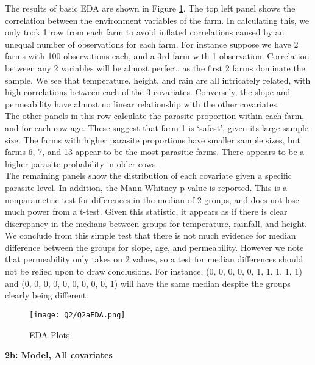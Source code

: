 \documentclass[11pt]{article}
\begin{document}
The results of basic EDA are shown in Figure \ref{Fig::2aEDA}. The top left panel shows the correlation between the environment variables of the farm. In calculating this, we only took 1 row from each farm to avoid inflated correlations caused by an unequal number of observations for each farm. For instance suppose we have 2 farms with 100 observations each, and a 3rd farm with 1 observation. Correlation between any 2 variables will be almost perfect, as the first 2 farms dominate the sample. We see that temperature, height, and rain are all intricately related, with high correlations between each of the 3 covariates. Conversely, the slope and permeability have almost no linear relationship with the other covariates. \\
The other panels in this row calculate the parasite proportion within each farm, and for each cow age. These suggest that farm 1 is `safest', given its large sample size. The farms with higher parasite proportions have smaller sample sizes, but farms 6, 7, and 13 appear to be the most parasitic farms. There appears to be a higher parasite probability in older cows. \\
The remaining panels show the distribution of each covariate given a specific parasite level. In addition, the Mann-Whitney p-value is reported. This is a nonparametric test for differences in the median of 2 groups, and does not lose much power from a t-test. Given this statistic, it appears as if there is clear discrepancy in the medians between groups for temperature, rainfall, and height. We conclude from this simple test that there is not much evidence for median difference between the groups for slope, age, and permeability. However we note that permeability only takes on 2 values, so a test for median differences should not be relied upon to draw conclusions. For instance, (0, 0, 0, 0, 0, 1, 1, 1, 1, 1) and (0, 0, 0, 0, 0, 0, 0, 0, 0, 1) will have the same median despite the groups clearly being different. 


\begin{figure}[!h]
\centering
\texttt{[image: Q2/Q2aEDA.png]}
\caption{EDA Plots} \label{Fig::2aEDA}
\end{figure}

\newpage
\textbf{2b: Model, All covariates} \label{sec::2b}
\end{document}
